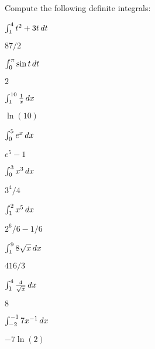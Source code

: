 \begin{exercises}
\noindent Compute the following definite integrals:

\twocol

\begin{exercise} $\int_1^4 t^2+3t\, d t$
\begin{answer} $87/2$
\end{answer}\end{exercise}

\begin{exercise} $\int_0^\pi \sin t\, d t$
\begin{answer} $2$
\end{answer}\end{exercise}

\begin{exercise} $\int_1^{10} {1\over x}\, d x$
\begin{answer} $\ln(10)$
\end{answer}\end{exercise}

\begin{exercise} $\int_0^5 e^x\, d x$
\begin{answer} $e^5-1$
\end{answer}\end{exercise}

\begin{exercise} $\int_0^3 x^3\, d x$
\begin{answer} $3^4/4$
\end{answer}\end{exercise}

\begin{exercise} $\int_1^2 x^5\, d x$
\begin{answer} $2^6/6 -1/6$
\end{answer}\end{exercise}


\begin{exercise} $\int_1^9 8\sqrt{x}\, d x$
\begin{answer} $416/3$
\end{answer}\end{exercise}

\begin{exercise} $\int_1^4 \frac{4}{\sqrt{x}}\, d x$
\begin{answer} $8$
\end{answer}\end{exercise}


\begin{exercise} $\int_{-2}^{-1}7x^{-1}\, d x$
\begin{answer} $-7\ln(2)$
\end{answer}\end{exercise}



\end{exercises}
